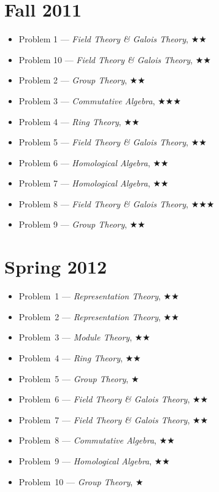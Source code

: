 \documentclass[11pt,letterpaper]{book}
\begin{document}
\section*{Fall 2011}
\begin{itemize}
\item Problem 1 --- \textit{Field Theory \& Galois Theory}, $\bigstar\bigstar$
\item Problem 10 --- \textit{Field Theory \& Galois Theory}, $\bigstar\bigstar$
\item Problem 2 --- \textit{Group Theory}, $\bigstar\bigstar$
\item Problem 3 --- \textit{Commutative Algebra}, $\bigstar\bigstar\bigstar$
\item Problem 4 --- \textit{Ring Theory}, $\bigstar\bigstar$
\item Problem 5 --- \textit{Field Theory \& Galois Theory}, $\bigstar\bigstar$
\item Problem 6 --- \textit{Homological Algebra}, $\bigstar\bigstar$
\item Problem 7 --- \textit{Homological Algebra}, $\bigstar\bigstar$
\item Problem 8 --- \textit{Field Theory \& Galois Theory}, $\bigstar\bigstar\bigstar$
\item Problem 9 --- \textit{Group Theory}, $\bigstar\bigstar$
\end{itemize}

\section*{Spring 2012}
\begin{itemize}
\item Problem~1 --- \textit{Representation Theory}, $\bigstar\bigstar$
\item Problem~2 --- \textit{Representation Theory}, $\bigstar\bigstar$
\item Problem~3 --- \textit{Module Theory}, $\bigstar\bigstar$
\item Problem~4 --- \textit{Ring Theory}, $\bigstar\bigstar$
\item Problem~5 --- \textit{Group Theory}, $\bigstar$
\item Problem~6 --- \textit{Field Theory \& Galois Theory}, $\bigstar\bigstar$
\item Problem~7 --- \textit{Field Theory \& Galois Theory}, $\bigstar\bigstar$
\item Problem~8 --- \textit{Commutative Algebra}, $\bigstar\bigstar$
\item Problem~9 --- \textit{Homological Algebra}, $\bigstar\bigstar$
\item Problem~10 --- \textit{Group Theory}, $\bigstar$
\end{itemize}
\end{document}
